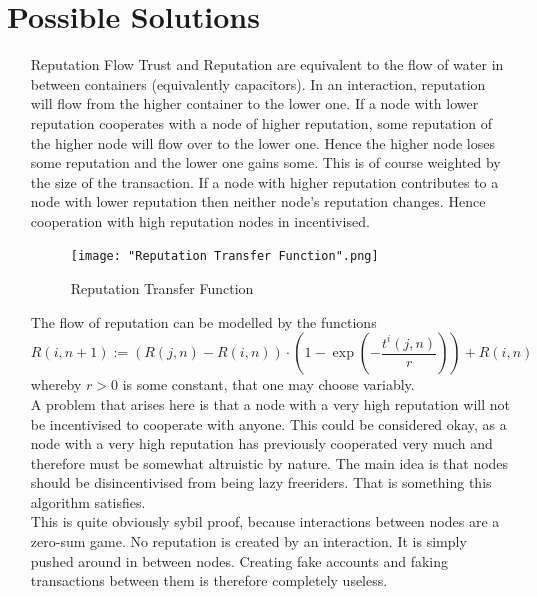 \documentclass[11pt,a4paper]{article}
\theoremstyle{definition}
\theoremstyle{theorem}
\theoremstyle{proposition}
\theoremstyle{corollary}
\theoremstyle{lemma}
\theoremstyle{example}
\theoremstyle{remark}
\begin{document}
\section{Possible Solutions}
\label{sec:Possible Solutions}
\begin{enumerate}
\item[Reputation Flow] Trust and Reputation are equivalent to the flow of water in between containers (equivalently capacitors). In an interaction, reputation will flow from the higher container to the lower one. If a node with lower reputation cooperates with a node of higher reputation, some reputation of the higher node will flow over to the lower one. Hence the higher node loses some reputation and the lower one gains some. This is of course weighted by the size of the transaction. If a node with higher reputation contributes to a node with lower reputation then neither node's reputation changes. Hence cooperation with high reputation nodes in incentivised. \vspace{1em}\\

\begin{figure}
\begin{center}
\texttt{[image: "Reputation Transfer Function".png]}
\caption{Reputation Transfer Function}
\label{fig:Reputation Transfer Function}
\end{center}
\end{figure}
\noindent{}The flow of reputation can be modelled by the functions
\[
R(i,n+1):=(R(j,n)-R(i,n))\cdot\left(1-\exp(-\frac{t^i(j,n)}{r})\right)+R(i,n)
\]
whereby $r>0$ is some constant, that one may choose variably. \vspace{1em}\\

\noindent{}A problem that arises here is that a node with a very high reputation will not be incentivised to cooperate with anyone. This could be considered okay, as a node with a very high reputation has previously cooperated very much and therefore must be somewhat altruistic by nature. The main idea is that nodes should be disincentivised from being lazy freeriders. That is something this algorithm satisfies. \vspace{1em}\\

\noindent{}This is quite obviously sybil proof, because interactions between nodes are a zero-sum game. No reputation is created by an interaction. It is simply pushed around in between nodes. Creating fake accounts and faking transactions between them is therefore completely useless.\vspace{1em}\\


\end{enumerate}
\end{document}
